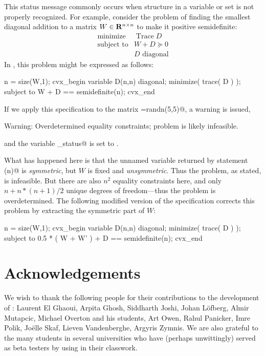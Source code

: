\documentclass[12pt]{article}
\begin{document}
This status message \verb@Overdetermined@ commonly occurs when structure
in a variable or set is not properly recognized. For example, consider the problem
of finding the smallest diagonal addition to a matrix $W\in\mathbf{R}^{{n}\times{n}}$ to make it positive semidefinite:
\begin{equation}
	\begin{array}{ll}
		\text{minimize} & \mathop{\text{Trace}} D \\
		\text{subject to} & W + D \succeq 0 \\
		                  & D \text{~diagonal}
	\end{array}
\end{equation}
In \cvx, this problem might be expressed as follows:
\begin{code}
	n = size(W,1);
	cvx_begin
	    variable D(n,n) diagonal;
	    minimize( trace( D ) );
	    subject to
	        W + D == semidefinite(n);
	cvx_end
\end{code}
If we apply this specification to the matrix \verb@W=randn(5,5)@, a warning is issued,
\begin{code}
	Warning: Overdetermined equality constraints;
	    problem is likely infeasible.
\end{code}
and the variable \verb@cvx_status@ is set to \verb@Overdetermined@. 

What has happened here
is that the unnamed variable returned by statement \verb@semidefinite(n)@ is \emph{symmetric}, but
$W$ is fixed and \emph{unsymmetric}. Thus the problem, as stated, is infeasible. But
there are also $n^2$ equality constraints here, and only $n+n*(n+1)/2$ unique degrees
of freedom---thus the problem is overdetermined. The following modified 
version of the specification corrects this problem by extracting the symmetric part of $W$:
\begin{code}
	n = size(W,1);
	cvx_begin
	    variable D(n,n) diagonal;
	    minimize( trace( D ) );
	    subject to
	        0.5 * ( W + W' ) + D == semidefinite(n);
	cvx_end
\end{code}

\section{Acknowledgements}

We wish to thank the following people for their contributions to
the development of \cvx:  Laurent El Ghaoui, Arpita Ghosh, 
Siddharth Joshi, Johan L\"{o}fberg, Almir Mutapcic, Michael Overton
and his students, Art Owen, Rahul Panicker, Imre Polik, Jo\"{e}lle Skaf, 
Lieven Vandenberghe, Argyris Zymnis. We are also grateful to the many
students in several universities who have (perhaps unwittingly)
served as beta testers by using \cvx in their classwork.

\newpage

\newpage
\printindex
\end{document}
